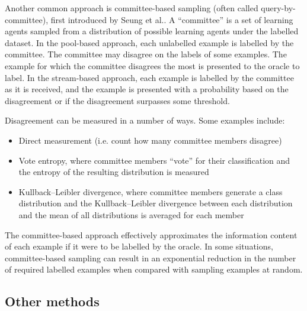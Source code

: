 \documentclass[a4paper]{article}
\begin{document}
            Another common approach is committee-based sampling (often called query-by-committee), first introduced by Seung et al.\cite{seung92}. A ``committee'' is a set of learning agents sampled from a distribution of possible learning agents under the labelled dataset\cite{mccallum98}. In the pool-based approach, each unlabelled example is labelled by the committee. The committee may disagree on the labels of some examples. The example for which the committee disagrees the most is presented to the oracle to label\cite{mccallum98}. In the stream-based approach, each example is labelled by the committee as it is received, and the example is presented with a probability based on the disagreement\cite{dagan95} or if the disagreement surpasses some threshold\cite{seung92}.

            Disagreement can be measured in a number of ways. Some examples include:
            \begin{itemize}
                \item Direct measurement (i.e. count how many committee members disagree)\cite{seung92}
                \item Vote entropy, where committee members ``vote'' for their classification and the entropy of the resulting distribution is measured\cite{dagan95,mccallum98}
                \item Kullback--Leibler divergence, where committee members generate a class distribution and the Kullback--Leibler divergence between each distribution and the mean of all distributions is averaged for each member\cite{mccallum98}
            \end{itemize}

            The committee-based approach effectively approximates the information content of each example if it were to be labelled by the oracle\cite{seung92}. In some situations, committee-based sampling can result in an exponential reduction in the number of required labelled examples when compared with sampling examples at random\cite{freund97}.

        \subsection{Other methods}
\end{document}
